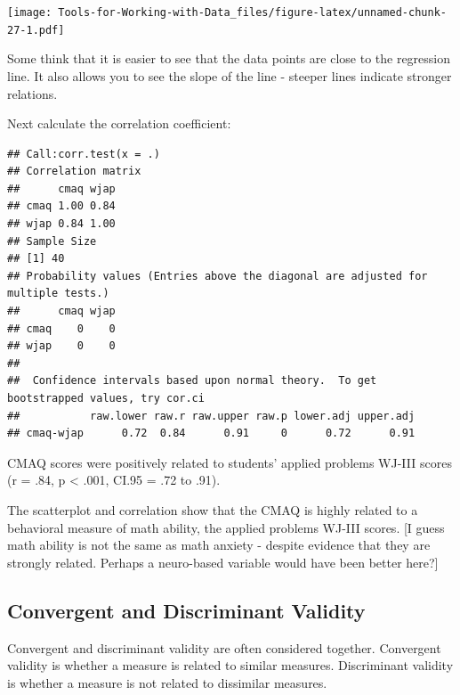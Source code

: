 \documentclass[
]{book}
\newenvironment{Shaded}{\begin{snugshade}}{\end{snugshade}}
\newcommand{\DataTypeTok}[1]{\textcolor[rgb]{0.13,0.29,0.53}{#1}}
\newcommand{\KeywordTok}[1]{\textcolor[rgb]{0.13,0.29,0.53}{\textbf{#1}}}
\newcommand{\NormalTok}[1]{#1}
\newcommand{\OperatorTok}[1]{\textcolor[rgb]{0.81,0.36,0.00}{\textbf{#1}}}
\newcommand{\OtherTok}[1]{\textcolor[rgb]{0.56,0.35,0.01}{#1}}
\newcommand{\StringTok}[1]{\textcolor[rgb]{0.31,0.60,0.02}{#1}}
\begin{document}
\texttt{[image: Tools-for-Working-with-Data\_files/figure-latex/unnamed-chunk-27-1.pdf]}

Some think that it is easier to see that the data points are close to the regression line. It also allows you to see the slope of the line - steeper lines indicate stronger relations.

Next calculate the correlation coefficient:

\begin{Shaded}
\end{Shaded}

\begin{verbatim}
## Call:corr.test(x = .)
## Correlation matrix 
##      cmaq wjap
## cmaq 1.00 0.84
## wjap 0.84 1.00
## Sample Size 
## [1] 40
## Probability values (Entries above the diagonal are adjusted for multiple tests.) 
##      cmaq wjap
## cmaq    0    0
## wjap    0    0
## 
##  Confidence intervals based upon normal theory.  To get bootstrapped values, try cor.ci
##           raw.lower raw.r raw.upper raw.p lower.adj upper.adj
## cmaq-wjap      0.72  0.84      0.91     0      0.72      0.91
\end{verbatim}

CMAQ scores were positively related to students' applied problems WJ-III scores (r = .84, p \textless{} .001, CI.95 = .72 to .91).

The scatterplot and correlation show that the CMAQ is highly related to a behavioral measure of math ability, the applied problems WJ-III scores. {[}I guess math ability is not the same as math anxiety - despite evidence that they are strongly related. Perhaps a neuro-based variable would have been better here?{]}

\hypertarget{convergent-and-discriminant-validity}{%
\subsection{Convergent and Discriminant Validity}\label{convergent-and-discriminant-validity}}

Convergent and discriminant validity are often considered together. Convergent validity is whether a measure is related to similar measures. Discriminant validity is whether a measure is not related to dissimilar measures.
\end{document}
